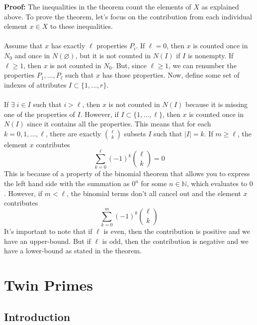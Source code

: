 \documentclass[8pt]{extarticle}
\begin{document}
\begin{boxedsection}
\textbf{Proof:} The inequalities in the theorem count the elements of $X$ as explained above. To prove the theorem, let's focus on the contribution from each individual element $x \in X$ to these inequalities.\\
\\
Assume that $x$ has exactly $\ell$ properties $P_i$. If $\ell = 0$, then $x$ is counted once in $N_0$ and once in $N(\varnothing)$, but it is not counted in $N(I)$ if $I$ is nonempty.  If $\ell \geq 1$, then $x$ is not counted in $N_0$. But, since $\ell \geq 1$, we can renumber the properties $P_1, \dots, P_\ell$ such that $x$ has those properties. Now, define some set of indexes of attributes $I \subset \{1,\dots,r\}$.\\
\\
If $\exists \; i \in I$ such that $i > \ell$, then $x$ is not counted in $N(I)$ because it is missing one of the properties of $I$. However, if $I \subset \{1,\dots,\ell\}$, then $x$ is counted once in $N(I)$ since it contains all the properties. This means that for each $k = 0,1,\dots,\ell$, there are exactly ${\ell \choose k}$ subsets $I$ such that $|I| = k$. If $m \geq \ell$, the element $x$ contributes 
$$
\sum_{k=0}^\ell (-1)^k {\ell \choose k} = 0
$$
This is because of a property of the binomial theorem that allows you to express the left hand side with the summation as $0^n$ for some $n \in \mathbb{N}$, which evaluates to $0$. However, if $m < \ell$, the binomial terms don't all cancel out and the element $x$ contributes
$$
\sum_{k=0}^m (-1)^k {\ell \choose k}
$$
It's important to note that if $\ell$ is even, then the contribution is positive and we have an upper-bound. But if $\ell$ is odd, then the contribution is negative and we have a lower-bound as stated in the theorem.
\end{boxedsection}

\pagebreak
\section{Twin Primes}
\subsection{Introduction}
\end{document}
